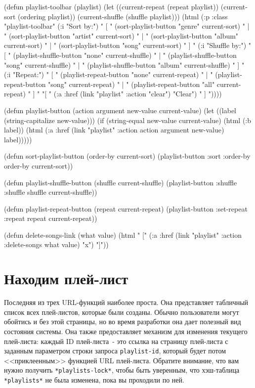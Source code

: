 \begin{myverb}
(defun playlist-toolbar (playlist)
  (let ((current-repeat (repeat playlist))
        (current-sort (ordering playlist))
        (current-shuffle (shuffle playlist)))
    (html
     (:p :class "playlist-toolbar"
         (:i "Sort by:")
         " [ "
         (sort-playlist-button "genre" current-sort) " | " 
         (sort-playlist-button "artist" current-sort) " | " 
         (sort-playlist-button "album" current-sort) " | " 
         (sort-playlist-button "song" current-sort) " ] "
         (:i "Shuffle by:")
         " [ "
         (playlist-shuffle-button "none" current-shuffle) " | "
         (playlist-shuffle-button "song" current-shuffle) " | "
         (playlist-shuffle-button "album" current-shuffle) " ] "
         (:i "Repeat:")
         " [ "
         (playlist-repeat-button "none" current-repeat) " | "
         (playlist-repeat-button "song" current-repeat) " | "
         (playlist-repeat-button "all" current-repeat) " ] "
         "[ " (:a :href (link "playlist" :action "clear") "Clear") " ] "))))

(defun playlist-button (action argument new-value current-value)
  (let ((label (string-capitalize new-value)))
    (if (string-equal new-value current-value)
      (html (:b label))
      (html (:a :href (link "playlist" :action action argument new-value) label)))))

(defun sort-playlist-button (order-by current-sort)
  (playlist-button :sort :order-by order-by current-sort))

(defun playlist-shuffle-button (shuffle current-shuffle)
  (playlist-button :shuffle :shuffle shuffle current-shuffle))

(defun playlist-repeat-button (repeat current-repeat)
  (playlist-button :set-repeat :repeat repeat current-repeat))

(defun delete-songs-link (what value)
  (html " [" (:a :href (link "playlist" :action :delete-songs what value) "x") "]"))
\end{myverb}

\section{Находим плей-лист}

Последняя из трех URL-функций наиболее проста. Она представляет табличный список всех
плей-листов, которые были созданы. Обычно пользователи могут обойтись и без этой страницы, но
во время разработки она дает полезный вид состояния системы. Она также предоставляет
механизм для изменения текущего плей-листа: каждый ID плей-листа~- это ссылка на страницу
плей-листа с заданным параметром строки запроса \lstinline{playlist-id}, который будет потом
<<приклеенным>> функцией URL плей-листа. Обратите внимание, что вам нужно получить
\lstinline{*playlists-lock*}, чтобы быть уверенным, что хэш-таблица \lstinline{*playlists*} не
была изменена, пока вы проходили по ней. 

